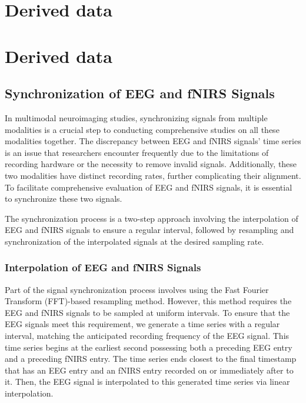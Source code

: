 \section{Derived data}


\section{Derived data}



\subsection{Synchronization of EEG and fNIRS Signals}


In multimodal neuroimaging studies, synchronizing signals from multiple modalities is a crucial step to conducting comprehensive studies on all these modalities together. The discrepancy between EEG and fNIRS signals' time series is an issue that researchers encounter frequently due to the limitations of recording hardware or the necessity to remove invalid signals. Additionally, these two modalities have distinct recording rates, further complicating their alignment. To facilitate comprehensive evaluation of EEG and fNIRS signals, it is essential to synchronize these two signals.

The synchronization process is a two-step approach involving the interpolation of EEG and fNIRS signals to ensure a regular interval, followed by resampling and synchronization of the interpolated signals at the desired sampling rate.

\subsubsection{Interpolation of EEG and fNIRS Signals}


Part of the signal synchronization process involves using the Fast Fourier Transform (FFT)-based resampling method. However, this method requires the EEG and fNIRS signals to be sampled at uniform intervals. To ensure that the EEG signals meet this requirement, we generate a time series with a regular interval, matching the anticipated recording frequency of the EEG signal. This time series begins at the earliest second possessing both a preceding EEG entry and a preceding fNIRS entry. The time series ends closest to the final timestamp that has an EEG entry and an fNIRS entry recorded on or immediately after to it. Then, the EEG signal is interpolated to this generated time series via linear interpolation.

